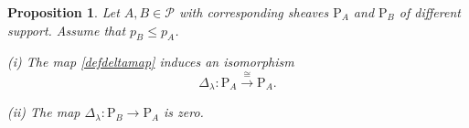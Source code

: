 \documentclass [11pt,oneside,a4paper,mathscr]{amsart}
\newtheorem{prop}[thm]{Proposition}
\theoremstyle{definition}
\renewcommand{\leq}{\leqslant}
\renewcommand{\geq}{\geqslant}
\begin{document}
\begin{prop}\label{prop310}
    Let $A, B\in \mathscr{P}$ with corresponding sheaves $\mathrm{P}_A$ and $\mathrm{P}_B$ of different support. Assume that $p_B\leq p_A$. 

    (i) %
        The map \eqref{defdeltamap} induces an isomorphism 
    \begin{equation}\label{mapdeltaaa}
        \Delta_\lambda\colon \mathrm{P}_A\xrightarrow{\cong} \mathrm{P}_A%
    .\end{equation}

    (ii) The map $\Delta_\lambda \colon \mathrm{P}_B\to \mathrm{P}_A$ is zero. 
\end{prop}
\end{document}

